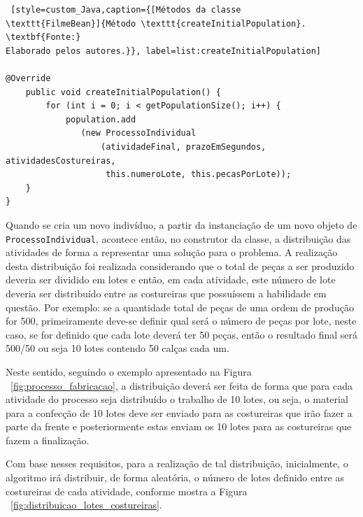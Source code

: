 \begin{lstlisting} [style=custom_Java,caption={[Métodos da classe
\texttt{FilmeBean}]{Método \texttt{createInitialPopulation}. \textbf{Fonte:}
Elaborado pelos autores.}}, label=list:createInitialPopulation]

@Override
	public void createInitialPopulation() {
		for (int i = 0; i < getPopulationSize(); i++) {
			population.add
			   (new ProcessoIndividual
			       (atividadeFinal, prazoEmSegundos, atividadesCostureiras,
			        this.numeroLote, this.pecasPorLote));
	}
}

\end{lstlisting}

\par Quando se cria um novo indivíduo, a partir da instanciação de um novo objeto de \texttt{ProcessoIndividual},
acontece então, no construtor da classe, a distribuição das atividades de forma a representar uma solução para o problema.
A realização desta distribuição foi realizada considerando que o total de
peças a ser produzido deveria ser dividido em lotes e então, em cada atividade,
este número de lote deveria ser distribuído entre as costureiras que possuíssem a habilidade em questão. Por exemplo: se a quantidade total de peças de uma ordem de produção for 500,
primeiramente deve-se definir qual será o número de peças por lote, neste caso, se for definido que cada lote  
deverá ter 50 peças, então o resultado final será 500/50 ou seja 10 lotes contendo 50 calças cada um. 

\par Neste sentido, seguindo o exemplo apresentado  na Figura
~\ref{fig:processo_fabricacao}, a distribuição deverá ser feita de forma que para cada atividade do processo seja 
distribuído o trabalho de 10 lotes, ou seja, o material para a confecção de 10 lotes deve ser enviado para as costureiras
que irão fazer a parte da frente e posteriormente estas enviam os 10 lotes para as costureiras que fazem a finalização.

\par Com base nesses requisitos, para a realização de tal distribuição, inicialmente, o algoritmo irá distribuir, 
de forma aleatória, o número de lotes definido entre as costureiras de cada atividade,
conforme mostra a Figura ~\ref{fig:distribuicao_lotes_costureiras}.

\newpage

